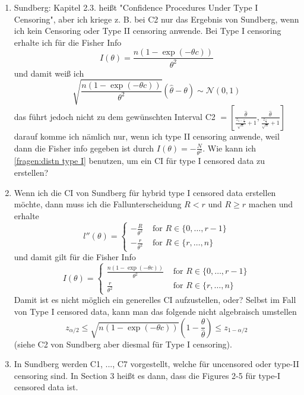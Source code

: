 \begin{enumerate}
	
	\item 
	Sundberg: Kapitel 2.3. heißt "Confidence Procedures Under Type I Censoring", aber ich kriege z. B. bei C2 nur das Ergebnis von Sundberg, wenn ich kein Censoring oder Type II censoring anwende. Bei Type I censoring erhalte ich für die Fisher Info
	\[
	I(\theta) = \frac{n (1 - \exp(- \theta c))}{\theta ^2}
	\]
	und damit weiß ich 
	\begin{equation} \label{fragen:distn type I}
		\sqrt{\frac{n (1 - \exp(- \theta c))}{\theta ^2}} (\hat \theta - \theta) \sim \mathcal N (0, 1)
	\end{equation}
	das führt jedoch nicht zu dem gewünschten Interval C2 $= \left[ \frac{\hat \theta}{\frac{z_{1 - \frac{\alpha}{2}}}{\sqrt{n}} + 1}, 
	\frac{\hat \theta}{\frac{z_{\frac{\alpha}{2}}}{\sqrt{n}} + 1}
	\right]$
	darauf komme ich nämlich nur, wenn ich type II censoring anwende, weil dann die Fisher info gegeben ist durch $I(\theta) = - \frac{N}{\theta^2}$. 
	Wie kann ich \eqref{fragen:distn type I} benutzen, um ein CI für type I censored data zu erstellen?
		\item 
	Wenn ich die CI von Sundberg für hybrid type I censored data erstellen möchte, dann muss ich die Fallunterscheidung $R < r$ und $R \geq r$ machen und erhalte
	\[
	l''(\theta) = \begin{cases}
		- \frac{R}{\theta^2} &\text{ for } R \in \{ 0, \ldots , r-1 \} \\
		- \frac{r}{\theta^2} &\text{ for } R \in \{ r, \ldots , n \}
	\end{cases}
	\]
	und damit gilt für die Fisher Info
	\[
	I(\theta) = \begin{cases}
		\frac{n(1- \exp(- \theta c))}{\theta^2} &\text{ for } R \in \{ 0, \ldots , r-1 \} \\
		\frac{r}{\theta^2} &\text{ for } R \in \{ r, \ldots , n \}
	\end{cases}
	\]
	Damit ist es nicht möglich ein generelles CI aufzustellen, oder?
	Selbst im Fall von Type I censored data, kann man das folgende nicht algebraisch umstellen
	\[ 
	z_{\alpha / 2} \leq \sqrt{n (1 - \exp(- \theta c))} \left( 1 - \frac{\theta}{\hat \theta} \right)
	\leq z_{1 - \alpha / 2}
	\]
	(siehe C2 von Sundberg aber diesmal für Type I censoring).
	
	\item 
	In Sundberg werden C1, ..., C7 vorgestellt, welche für uncensored oder type-II censoring sind. In Section 3 heißt es dann, dass die Figures 2-5 für type-I censored data ist. 
\end{enumerate}


